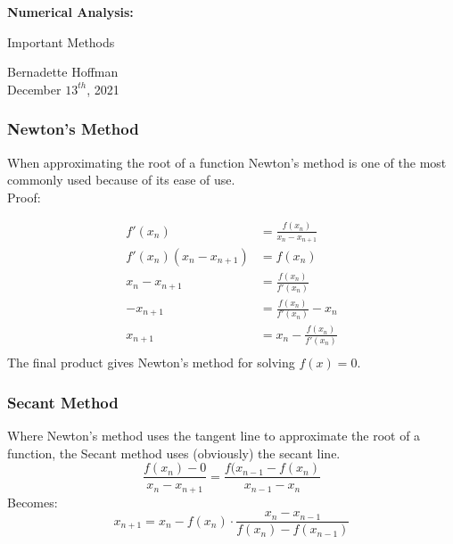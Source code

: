 \documentclass{beamer}
\begin{document}
\begin{frame}

\begin{center}

\Huge \color{orange}\textbf{Numerical Analysis:} 

\Large \color{purple}Important Methods \\

\bigskip

\large \color{cyan}Bernadette Hoffman \\

\normalsize \color{black} December $13^{th}$, 2021

\end{center}

\end{frame}

\begin{frame}

\frametitle{\color{orange}Newton's Method}

\normalsize \color{black}
When approximating the root of a function Newton's method is one of the most commonly used because of its ease of use.\\ Proof:
\begin{center}
\color{purple} 
\begin{align*}
 f'(x_n) &= \frac{f(x_n)}{x_n - x_{n+1}} \\ 
 f'(x_n)(x_n - x_{n+1}) &= f(x_n) \\ 
 x_n - x_{n+1} &= \frac{f(x_n)}{f'(x_n)} \\ 
 -x_{n+1} &= \frac{f(x_n)}{f'(x_n)} - x_n \\ 
 x_{n+1} &= x_n - \frac{f(x_n)}{f'(x_n)} \\ 
\end{align*} 
\color{black}The final product gives Newton's method for solving $f(x)=0$.
\end{center}
\end{frame}

\begin{frame}
\frametitle{\color{orange}Secant Method}
Where Newton's method uses the tangent line to approximate the root of a function, the Secant method uses (obviously) the secant line. \\
\color{purple}
$$ \frac{f(x_n)-0}{x_n - x_{n+1}} = \frac{f(x_{n-1} - f(x_n)}{x_{n-1} - x_n} $$ \pause
\color{black}Becomes: \\ \pause
\color{purple}$$ x_{n+1} = x_n - f(x_n) \cdot \frac{x_n - x_{n-1}}{f(x_n) - f(x_{n-1})} $$

\end{frame}
\end{document}
